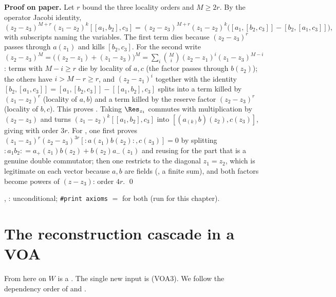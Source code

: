 \textbf{Proof on paper.} Let $r$ bound the three locality orders and $M\ge2r$. By the operator
Jacobi identity,
\begin{equation*}
(z_2-z_3)^{M+r}(z_1-z_2)^k[[a_1,b_2],c_3] = (z_2-z_3)^{M+r}(z_1-z_2)^k\big([a_1,[b_2,c_3]] - [b_2,[a_1,c_3]]\big),
\end{equation*}
with subscripts naming the variables. The first term dies because $(z_2-z_3)^r$ passes through
$a(z_1)$ and kills $[b_2,c_3]$. For the second write $(z_2-z_3)^{M} = \big((z_2-z_1)+(z_1-z_3)\big)^{M} =
\sum_i\binom Mi(z_2-z_1)^{i}(z_1-z_3)^{M-i}$: terms with $M-i\ge r$ die by locality of $a,c$ (the factor
passes through $b(z_2)$); the others have $i>M-r\ge r$, and $(z_2-z_1)^i$ together with the identity
$[b_2,[a_1,c_3]] = [a_1,[b_2,c_3]] - [[a_1,b_2],c_3]$ splits into a term killed by $(z_1-z_2)^r$
(locality of $a,b$) and a term killed by the reserve factor $(z_2-z_3)^r$ (locality of $b,c$). This
proves . Taking $\Res_{z_1}$ commutes with multiplication by $(z_2-z_3)$ and turns
$(z_1-z_2)^k[[a_1,b_2],c_3]$ into $[(a_{(k)}b)(z_2),c(z_3)]$, giving  with order
$3r$. For , one first proves $(z_1-z_3)^r(z_2-z_3)^{3r}[{:}a(z_1)b(z_2){:},c(z_3)] = 0$
by splitting ${:}a_1b_2{:} = a_+(z_1)b(z_2) + b(z_2)a_-(z_1)$ and reusing  for the
part that is a genuine double commutator; then one restricts to the diagonal $z_1 = z_2$, which is
legitimate on each vector because $a,b$ are fields (, a finite sum), and both factors
become powers of $(z-z_3)$: order $4r$. \qed

\begin{status}
, : unconditional; \texttt{\#print axioms} $=$
 for both (run for this chapter).
\end{status}

\section{The reconstruction cascade in a VOA}\label{l03:sec:cascade}

From here on $W$ is a . The single new input is (VOA3). We follow the
dependency order of  and
.

